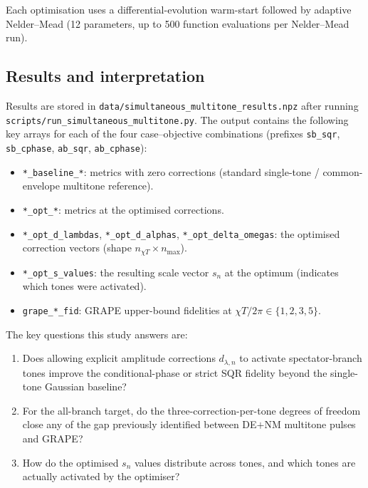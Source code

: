 \documentclass[11pt]{article}
\begin{document}
Each optimisation uses a differential-evolution warm-start followed by
adaptive Nelder--Mead (12 parameters, up to 500 function evaluations per
Nelder--Mead run).

\subsection{Results and interpretation}

Results are stored in \texttt{data/simultaneous\_multitone\_results.npz}
after running \texttt{scripts/run\_simultaneous\_multitone.py}.  The output
contains the following key arrays for each of the four case--objective
combinations (prefixes \texttt{sb\_sqr}, \texttt{sb\_cphase},
\texttt{ab\_sqr}, \texttt{ab\_cphase}):

\begin{itemize}
    \item \texttt{*\_baseline\_*}: metrics with zero corrections (standard
    single-tone / common-envelope multitone reference).
    \item \texttt{*\_opt\_*}: metrics at the optimised corrections.
    \item \texttt{*\_opt\_d\_lambdas}, \texttt{*\_opt\_d\_alphas},
    \texttt{*\_opt\_delta\_omegas}: the optimised correction vectors
    (shape $n_{\chi T}\times n_{\max}$).
    \item \texttt{*\_opt\_s\_values}: the resulting scale vector $s_n$ at
    the optimum (indicates which tones were activated).
    \item \texttt{grape\_*\_fid}: GRAPE upper-bound fidelities at
    $\chi T/2\pi \in \{1,2,3,5\}$.
\end{itemize}

The key questions this study answers are:
\begin{enumerate}[label=\arabic*.]
    \item Does allowing explicit amplitude corrections $d_{\lambda,n}$ to
    activate spectator-branch tones improve the conditional-phase or strict
    SQR fidelity beyond the single-tone Gaussian baseline?
    \item For the all-branch target, do the three-correction-per-tone
    degrees of freedom close any of the gap previously identified between
    DE$+$NM multitone pulses and GRAPE?
    \item How do the optimised $s_n$ values distribute across tones, and
    which tones are actually activated by the optimiser?
\end{enumerate}
\end{document}
